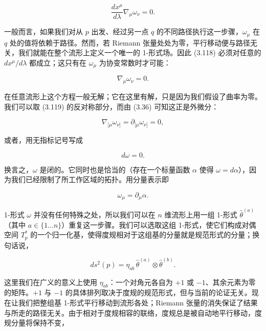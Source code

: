 \begin{equation*}
\frac{dx^\mu}{d\lambda}\nabla_\mu\omega_\nu = 0. \tag{3.118}
\end{equation*}

一般而言，如果我们对从 $p$ 出发、经过另一点 $q$ 的不同路径执行这一步骤，$\omega_\mu$ 在 $q$ 处的值将依赖于路径。然而，若 Riemann 张量处处为零，平行移动便与路径无关，我们就能在整个流形上定义一个唯一的 1-形式场。因此 (3.118) 必须对任意的 $dx^\mu/d\lambda$ 都成立；这只有在 $\omega_\mu$ 为协变常数时才可能：

\begin{equation*}
\nabla_\mu\omega_\nu = 0. \tag{3.119}
\end{equation*}

在任意流形上这个方程一般无解；它在这里有解，只是因为我们假设了曲率为零。我们可以取 (3.119) 的反对称部分，而由 (3.36) 可知这正是外微分：

\begin{equation*}
\nabla_{[\mu}\omega_{\nu]} = \partial_{[\mu}\omega_{\nu]} = 0, \tag{3.120}
\end{equation*}

或者，用无指标记号写成

\begin{equation*}
d\omega = 0. \tag{3.121}
\end{equation*}

换言之，$\omega$ 是闭的。它同时也是恰当的（存在一个标量函数 $\alpha$ 使得 $\omega = d\alpha$），因为我们已经限制了所工作区域的拓扑。用分量表示即

\begin{equation*}
\omega_\mu = \partial_\mu\alpha. \tag{3.122}
\end{equation*}

1-形式 $\omega$ 并没有任何特殊之处，所以我们可以在 $n$ 维流形上用一组 1-形式 $\hat\theta^{(a)}$（其中 $a \in \{1 \ldots n\}$）重复这一步骤。我们可以选取这组 1-形式，使它们构成对偶空间 $T^*_p$ 的一个归一化基，使得度规相对于这组基的分量就是规范形式的分量；换句话说，

\begin{equation*}
ds^2(p) = \eta_{ab}\, \hat\theta^{(a)}\otimes\hat\theta^{(b)}. \tag{3.123}
\end{equation*}

这里我们在广义的意义上使用 $\eta_{ab}$：一个对角元各自为 $+1$ 或 $-1$、其余元素为零的矩阵。$+1$ 与 $-1$ 的具体排列取决于度规的规范形式，但与当前的论证无关。现在让我们把整组基 1-形式平行移动到流形各处；Riemann 张量的消失保证了结果与所走的路径无关。由于相对于度规相容的联络，度规总是被自动地平行移动，度规分量将保持不变，

